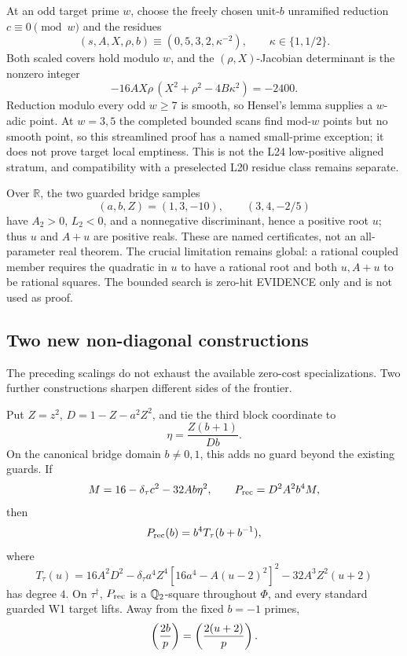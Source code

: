 At an odd target prime \(w\), choose the freely chosen unit-\(b\)
unramified reduction \(c\equiv0\pmod w\) and the residues
\[
 (s,A,X,\rho,b)\equiv(0,5,3,2,\kappa^{-2}),\qquad \kappa\in\{1,1/2\}.
\]
Both scaled covers hold modulo \(w\), and the \((\rho,X)\)-Jacobian
determinant is the nonzero integer
\[
 -16AX\rho\,(X^2+\rho^2-4B\kappa^2)=-2400.
\]
Reduction modulo every odd \(w\ge7\) is smooth, so Hensel's lemma
supplies a \(w\)-adic point.  At \(w=3,5\) the completed bounded scans
find mod-\(w\) points but no smooth point, so this streamlined proof has
a named small-prime exception; it does not prove target local emptiness.
This is not the L24 low-positive aligned stratum, and compatibility with
a preselected L20 residue class remains separate.

Over \(\mathbb R\), the two guarded bridge samples
\[
 (a,b,Z)=(1,3,-10),\qquad (3,4,-2/5)
\]
have \(A_2>0\), \(L_2<0\), and a nonnegative discriminant, hence a
positive root \(u\); thus \(u\) and \(A+u\) are positive reals.  These
are named certificates, not an all-parameter real theorem.  The crucial
limitation remains global: a rational coupled member requires the
quadratic in \(u\) to have a rational root and both \(u,A+u\) to be
rational squares.  The bounded search is zero-hit EVIDENCE only and is
not used as proof.

\subsection{Two new non-diagonal constructions}

The preceding scalings do not exhaust the available zero-cost
specializations.  Two further constructions sharpen different sides of
the frontier.

\begin{theorem}
\label{thm:reciprocaltie}
Put \(Z=z^2\), \(D=1-Z-a^2Z^2\), and tie the third block coordinate to
\[
 \eta=\frac{Z(b+1)}{Db}.
\]
On the canonical bridge domain \(b\ne0,1\), this adds no guard beyond
the existing guards.  If
\[
 M=16-\delta_\tau c^2-32Ab\eta^2,\qquad
 P_{\rm rec}=D^2A^2b^4M,
\]
then
\[
 P_{\rm rec}(b)=b^4T_\tau(b+b^{-1}),
\]
where
\[
 T_\tau(u)=16A^2D^2-\delta_\tau a^4Z^4
 [16a^4-A(u-2)^2]^2-32A^3Z^2(u+2)
\]
has degree \(4\).  On \(\tau^\dagger\), \(P_{\rm rec}\) is a
\(\mathbb{Q}_2\)-square throughout \(\Phi\), and every standard guarded W1
target lifts.  Away from the fixed \(b=-1\) primes,
\[
 \left(\frac{2b}{p}\right)=\left(\frac{2(u+2)}{p}\right).
\]
\end{theorem}

